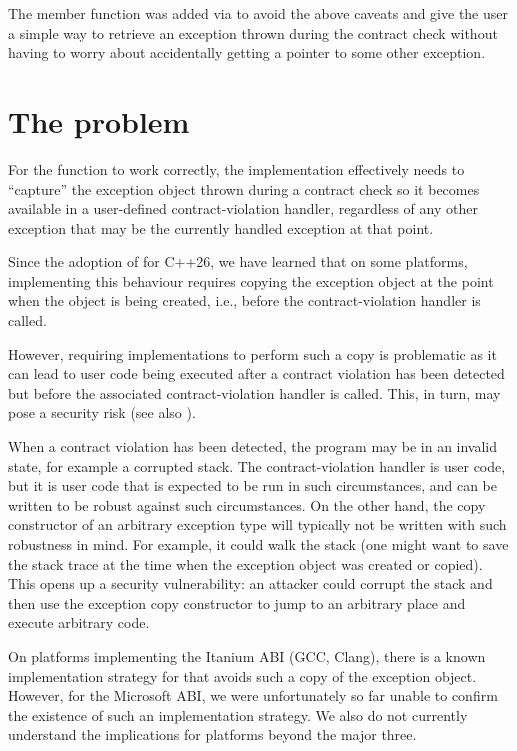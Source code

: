 The member function  was added via \cite{P3227R1} to avoid the above caveats and give the user a simple way to retrieve an exception thrown during the contract check without having to worry about accidentally getting a pointer to some other exception. 

\section{The problem}

For the function  to work correctly, the implementation effectively needs to ``capture'' the exception object thrown during a contract check so it becomes available in a user-defined contract-violation handler, regardless of any other exception that may be the currently handled exception at that point.

Since the adoption of \cite{P2900R14} for C++26, we have learned that on some platforms, implementing this behaviour requires copying the exception object at the point when the  object is being created, i.e., before the contract-violation handler is called.

However, requiring implementations to perform such a copy is problematic as it can lead to user code being executed after a contract violation has been detected but before the associated contract-violation handler is called. This, in turn, may pose a security risk (see also \cite{P3417R1}).

When a contract violation has been detected, the program may be in an invalid state, for example a corrupted stack. The contract-violation handler is user code, but it is user code that is expected to be run in such circumstances, and can be written to be robust against such circumstances. On the other hand, the copy constructor of an arbitrary exception type will typically not be written with such robustness in mind. For example, it could walk the stack (one might want to save the stack trace at the time when the exception object was created or copied). This opens up a security vulnerability: an attacker could corrupt the stack and then use the exception copy constructor to jump to an arbitrary place and execute arbitrary code.

On platforms implementing the Itanium ABI (GCC, Clang), there is a known implementation strategy for    that avoids such a copy of the exception object. However, for the Microsoft ABI, we were unfortunately so far unable to confirm the existence of such an implementation strategy. We also do not currently understand the implications for platforms beyond the major three.

